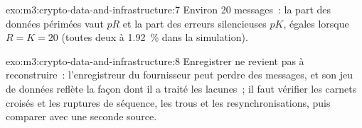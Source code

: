 \begin{solution}{exo:m3:crypto-data-and-infrastructure:7}
Environ 20 messages~: la part des données périmées vaut $pR$ et la part des erreurs silencieuses $pK$, égales lorsque $R = K = 20$ (toutes deux à 1.92~\% dans la simulation).
\end{solution}

\begin{solution}{exo:m3:crypto-data-and-infrastructure:8}
Enregistrer ne revient pas à reconstruire~: l'enregistreur du fournisseur peut perdre des messages, et son jeu de données reflète la façon dont il a traité les lacunes~; il faut vérifier les carnets croisés et les ruptures de
séquence, les trous et les resynchronisations, puis comparer avec une seconde source.
\end{solution}

